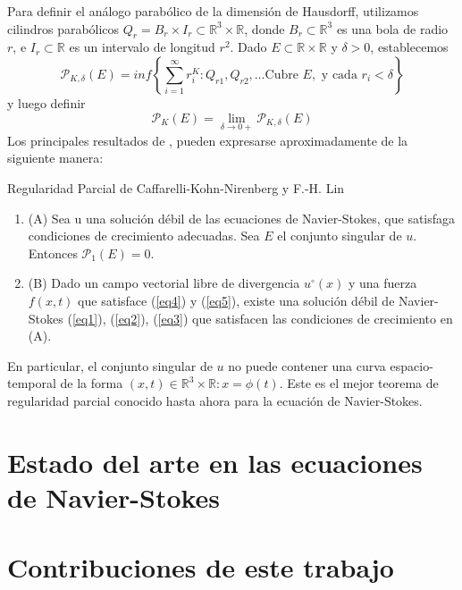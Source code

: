 Para definir el análogo parabólico de la dimensión de Hausdorff, utilizamos cilindros parabólicos $Q_r = B_r \times I_r \subset \mathbb{R}^3 \times \mathbb{R}$, donde $B_r \subset \mathbb{R}^3$ es una bola de radio $r$, e $I_r \subset \mathbb{R}$ es un intervalo de longitud $r^2$. Dado $E \subset \mathbb{R} \times \mathbb{R}$ y $\delta  > 0$, establecemos
\begin{equation*}
    \mathcal{P}_{K,\delta}(E) = inf \left\{ \sum_{i = 1}^{\infty} r_{i}^{K}:Q_{r1},Q_{r2},\dots\text{Cubre }E, \text{ y cada }r_i<\delta \right\} 
\end{equation*}
y luego definir
\begin{equation*}
    \mathcal{P}_K(E) = \lim_{\delta \to 0+} \mathcal{P}_{K,\delta}(E)
\end{equation*}
Los principales resultados de \cite{caffarelli1982partial}, \cite{lin1998new} pueden expresarse aproximadamente de la siguiente manera:
\begin{theorem}
    Regularidad Parcial de Caffarelli-Kohn-Nirenberg y F.-H. Lin
    \begin{enumerate}
        \item (A) Sea u una solución débil de las ecuaciones de Navier-Stokes, que satisfaga condiciones de crecimiento adecuadas. Sea $E$ el conjunto singular de $u$. Entonces $\mathcal{P}_1(E)=0$.
        \item (B) Dado un campo vectorial libre de divergencia $u^{\circ}(x)$ y una fuerza $f(x, t)$ que satisface (\ref{eq4}) y (\ref{eq5}), existe una solución débil de Navier-Stokes (\ref{eq1}), (\ref{eq2}), (\ref{eq3}) que satisfacen las condiciones de crecimiento en (A).
    \end{enumerate}
\end{theorem}
En particular, el conjunto singular de $u$ no puede contener una curva espacio-temporal de la forma ${(x, t) \in \mathbb{R}^3 \times \mathbb{R}: x = \phi (t)}$. Este es el mejor teorema de regularidad parcial conocido hasta ahora para la ecuación de Navier-Stokes.








\section{Estado del arte en las ecuaciones de Navier-Stokes}


\section{Contribuciones de este trabajo}


